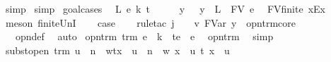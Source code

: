 \begin{isabellebody}
\ simp{\isacharplus}\isanewline
{}\isamarkupfalse%
\isanewline
{}\isamarkupfalse%
\ simp\isanewline
{}\isamarkupfalse%
\ goal{\isacharunderscore}cases\isanewline
{}\isamarkupfalse%
\ {\isacharparenleft}{}\ L\ e\ k\ t{\isacharparenright}\isanewline
\ \ \isamarkupfalse%
\ \isamarkupfalse%
\ y\ \ {}{\isacharcolon}\ {\isachardoublequoteopen}y\ {\isasymnotin}\ {\isacharparenleft}L\ {\isasymunion}\ FV\ e{\isacharparenright}{\isachardoublequoteclose}\ \isamarkupfalse%
\ FV{\isacharunderscore}finite\ x{\isacharunderscore}Ex\ \isamarkupfalse%
\ {\isacharparenleft}meson\ finite{\isacharunderscore}UnI{\isacharparenright}\isanewline
\ \ \isamarkupfalse%
\ {\isacharquery}case\isanewline
\ \ \isamarkupfalse%
\ {\isacharparenleft}rule{\isacharunderscore}tac\ j\ {\isacharequal}\ {}\ \ v{\isacharequal}\ {\isachardoublequoteopen}FVar\ y{\isachardoublequoteclose}\ \ opn{\isacharunderscore}trm{\isacharunderscore}core{\isacharparenright}\isanewline
\ \ \isamarkupfalse%
\ {\isachardoublequoteopen}{}{\isachardoublequoteclose}{\isacharparenleft}{}{\isacharparenright}\ {\isachardoublequoteopen}{}{\isachardoublequoteclose}\ opn{\isacharprime}{\isacharunderscore}def\ \isamarkupfalse%
\ auto\isanewline
{}\isamarkupfalse%
%
\endisatagproof
{\isafoldproof}%
%
\isadelimproof
\isanewline
%
\endisadelimproof
\isanewline
{}\isamarkupfalse%
\ opn{\isacharunderscore}trm{}{\isacharcolon}\ {\isachardoublequoteopen}trm\ e\ {\isasymLongrightarrow}\ {\isacharbraceleft}k\ {\isasymrightarrow}\ t{\isacharbraceright}e\ {\isacharequal}\ e{\isachardoublequoteclose}\ \isanewline
%
\isadelimproof
%
\endisadelimproof
%
\isatagproof
{}\isamarkupfalse%
\ opn{\isacharunderscore}trm\ \isamarkupfalse%
\ simp%
\endisatagproof
{\isafoldproof}%
%
\isadelimproof
\isanewline
%
\endisadelimproof
\isanewline
{}\isamarkupfalse%
\ subst{\isacharunderscore}open{\isacharcolon}\ {\isachardoublequoteopen}trm\ u\ {\isasymLongrightarrow}\ {\isacharparenleft}{\isacharbraceleft}n\ {\isasymrightarrow}\ w{\isacharbraceright}t{\isacharparenright}{\isacharbrackleft}x\ {\isacharcolon}{\isacharcolon}{\isacharequal}\ u{\isacharbrackright}\ {\isacharequal}\ {\isacharbraceleft}n\ {\isasymrightarrow}\ w\ {\isacharbrackleft}x\ {\isacharcolon}{\isacharcolon}{\isacharequal}\ u{\isacharbrackright}{\isacharbraceright}\ {\isacharparenleft}t\ {\isacharbrackleft}x\ {\isacharcolon}{\isacharcolon}{\isacharequal}\ u{\isacharbrackright}{\isacharparenright}{\isachardoublequoteclose}\isanewline

\end{isabellebody}
